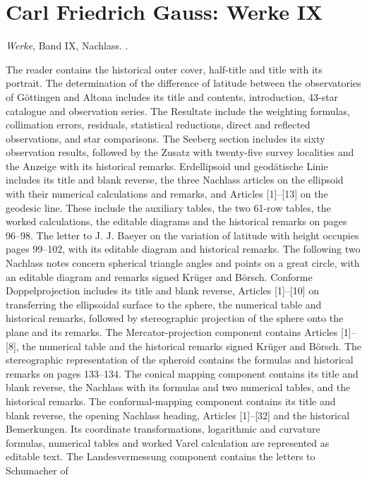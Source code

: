 \section*{Carl Friedrich Gauss: Werke IX}
\begingroup\footnotesize
\noindent\textit{Werke}, Band IX, Nachlass. \EditionScope.

The reader contains the historical outer cover, half-title and title with
its portrait. The determination of the difference of latitude between the
observatories of Göttingen and Altona includes its title and contents,
introduction, 43-star catalogue and observation series. The Resultate include
the weighting formulas, collimation errors, residuals, statistical reductions,
direct and reflected observations, and star comparisons. The Seeberg section includes its sixty
observation results, followed by the Zusatz with twenty-five survey
localities and the Anzeige with its historical remarks.
Erdellipsoid
und geodätische Linie includes its title and blank reverse, the three
Nachlass articles on the ellipsoid with their numerical calculations
and remarks, and Articles [1]--[13] on the geodesic line. These include
the auxiliary tables, the two 61-row tables, the worked calculations,
the editable diagrams and the historical remarks on pages 96--98.
The letter to J. J. Baeyer on the variation of latitude with height occupies
pages 99--102, with its editable diagram and historical remarks.
The following two
Nachlass notes concern spherical triangle angles and points on a great
circle, with an editable diagram and remarks signed Krüger and Börsch.
Conforme Doppelprojection includes its title and blank reverse, Articles
[1]--[10] on transferring the ellipsoidal surface to the sphere, the
numerical table and historical remarks, followed by stereographic
projection of the sphere onto the plane and its remarks.
The Mercator-projection component
contains Articles [1]--[8], the numerical table and the historical remarks
signed Krüger and Börsch. The stereographic representation of the spheroid
contains the formulas and historical remarks on pages 133--134. The conical
mapping component contains its title and blank reverse, the Nachlass with
its formulas and two numerical tables, and the historical remarks.
The conformal-mapping component contains its title and blank reverse, the opening Nachlass heading,
Articles [1]--[32] and the historical Bemerkungen.
Its coordinate transformations, logarithmic and curvature formulas,
numerical tables and worked Varel calculation are represented as editable text.
The Landesvermessung component contains the letters to Schumacher of
